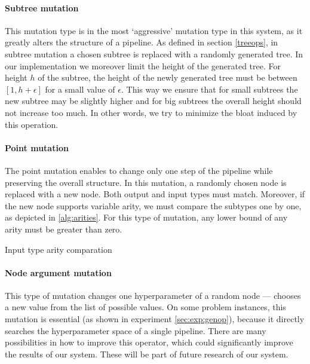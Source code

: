 \paragraph{Subtree mutation}
This mutation type is in the most `aggressive' mutation type in this system, as
it greatly alters the structure of a pipeline. As defined in section \ref{treeops},
in subtree mutation a chosen subtree is
replaced with a randomly generated tree. In our implementation we moreover
limit the height of the generated tree. For height $h$ of the subtree, the
height of the newly generated tree must be between $[1, h + \epsilon]$ for a
small value of $\epsilon$. This way we ensure that for small subtrees the new
subtree may be slightly higher and for big subtrees the overall height should
not increase too much. In other words, we try to minimize the bloat induced by
this operation.

\paragraph{Point mutation}
The point mutation enables to change only one step of the pipeline while preserving
the overall structure. In this mutation, a randomly chosen node is replaced with a
new node. Both output and input types must match. Moreover, if the new node
supports variable arity, we must compare the subtypes one by one, as depicted in
\ref{alg:arities}. For this type of mutation, any lower bound of any arity must
be greater than zero.


\begin{algorithm}[t]
\DontPrintSemicolon 
\caption{Input type arity comparation\label{alg:arities}}
  \;
  \;
  
\end{algorithm}

\paragraph{Node argument mutation}
This type of mutation changes one hyperparameter of a random node --- chooses a new
value from the list of possible values. On some problem instances, this mutation
is essential (as shown in experiment \ref{sec:exp:genop}), because it directly searches the hyperparameter space of a
single pipeline. There are many possibilities in how to improve this operator, which
could significantly improve the results of our system. These will be part of future
research of our system.

